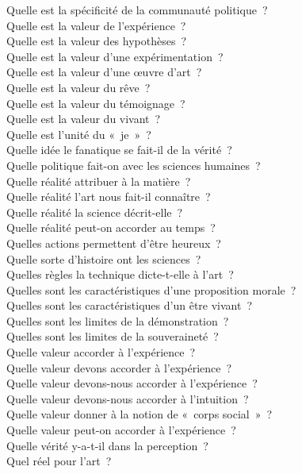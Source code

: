 \documentclass[a4paper,12pt]{article}
\begin{document}
Quelle est la spécificité de la communauté politique ? \\
Quelle est la valeur de l'expérience ? \\
Quelle est la valeur des hypothèses ? \\
Quelle est la valeur d'une expérimentation ? \\
Quelle est la valeur d'une œuvre d'art ? \\
Quelle est la valeur du rêve ? \\
Quelle est la valeur du témoignage ? \\
Quelle est la valeur du vivant ? \\
Quelle est l'unité du « je » ? \\
Quelle idée le fanatique se fait-il de la vérité ? \\
Quelle politique fait-on avec les sciences humaines ? \\
Quelle réalité attribuer à la matière ? \\
Quelle réalité l'art nous fait-il connaître ? \\
Quelle réalité la science décrit-elle ? \\
Quelle réalité peut-on accorder au temps ? \\
Quelles actions permettent d'être heureux ? \\
Quelle sorte d'histoire ont les sciences ? \\
Quelles règles la technique dicte-t-elle à l'art ? \\
Quelles sont les caractéristiques d'une proposition morale ? \\
Quelles sont les caractéristiques d'un être vivant ? \\
Quelles sont les limites de la démonstration ? \\
Quelles sont les limites de la souveraineté ? \\
Quelle valeur accorder à l'expérience ? \\
Quelle valeur devons accorder à l'expérience ? \\
Quelle valeur devons-nous accorder à l'expérience ? \\
Quelle valeur devons-nous accorder à l'intuition ? \\
Quelle valeur donner à la notion de « corps social » ? \\
Quelle valeur peut-on accorder à l'expérience ? \\
Quelle vérité y-a-t-il dans la perception ? \\
Quel réel pour l'art ? \\
\end{document}
